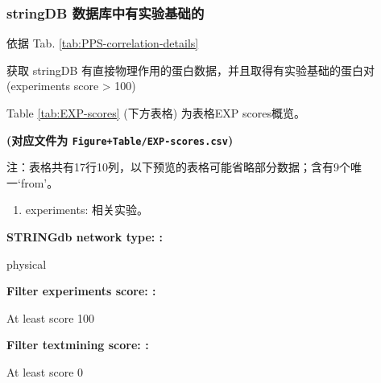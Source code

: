 \documentclass[
]{article}
\providecommand{\tightlist}{%
  \setlength{\itemsep}{0pt}\setlength{\parskip}{0pt}}
\begin{document}
\hypertarget{stringdb-ux6570ux636eux5e93ux4e2dux6709ux5b9eux9a8cux57faux7840ux7684}{%
\subsubsection{stringDB 数据库中有实验基础的}\label{stringdb-ux6570ux636eux5e93ux4e2dux6709ux5b9eux9a8cux57faux7840ux7684}}

依据 Tab. \ref{tab:PPS-correlation-details}

获取 stringDB 有直接物理作用的蛋白数据，并且取得有实验基础的蛋白对
(experiments score \textgreater{} 100)

Table \ref{tab:EXP-scores} (下方表格) 为表格EXP scores概览。

\textbf{(对应文件为 \texttt{Figure+Table/EXP-scores.csv})}

\begin{center}\begin{tcolorbox}[colback=gray!10, colframe=gray!50, width=0.9\linewidth, arc=1mm, boxrule=0.5pt]注：表格共有17行10列，以下预览的表格可能省略部分数据；含有9个唯一`from'。
\end{tcolorbox}
\end{center}
\begin{center}\begin{tcolorbox}[colback=gray!10, colframe=gray!50, width=0.9\linewidth, arc=1mm, boxrule=0.5pt]\begin{enumerate}\tightlist
\item experiments:  相关实验。
\end{enumerate}\end{tcolorbox}
\end{center}\begin{center}\begin{tcolorbox}[colback=gray!10, colframe=gray!50, width=0.9\linewidth, arc=1mm, boxrule=0.5pt]
\textbf{
STRINGdb network type:
:}

\vspace{0.5em}

    physical

\vspace{2em}


\textbf{
Filter experiments score:
:}

\vspace{0.5em}

    At least score 100

\vspace{2em}


\textbf{
Filter textmining score:
:}

\vspace{0.5em}

    At least score 0

\vspace{2em}
\end{tcolorbox}
\end{center}
\end{document}
